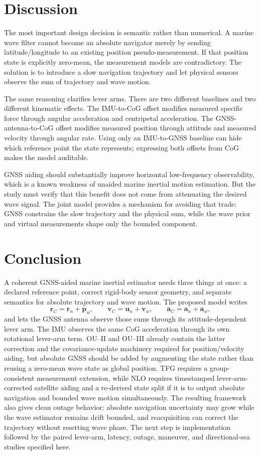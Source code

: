 \documentclass[conference]{IEEEtran}
\DeclareRobustCommand{\vct}[1]{\bm{#1}}
\begin{document}
\section{Discussion}
\label{sec:discussion}

The most important design decision is semantic rather than numerical.  A marine wave
filter cannot become an absolute navigator merely by sending latitude/longitude to an
existing position pseudo-measurement.  If that position state is explicitly
zero-mean, the measurement models are contradictory.  The solution is to introduce a
slow navigation trajectory and let physical sensors observe the sum of trajectory and
wave motion.

The same reasoning clarifies lever arms.  There are two different baselines and two
different kinematic effects.  The IMU-to-CoG offset modifies measured specific force
through angular acceleration and centripetal acceleration.  The GNSS-antenna-to-CoG
offset modifies measured position through attitude and measured velocity through
angular rate.  Using only an IMU-to-GNSS baseline can hide which reference point the
state represents; expressing both offsets from CoG makes the model auditable.

GNSS aiding should substantially improve horizontal low-frequency observability, which
is a known weakness of unaided marine inertial motion estimation.  But the study must
verify that this benefit does not come from attenuating the desired wave signal.  The
joint model provides a mechanism for avoiding that trade: GNSS constrains the slow
trajectory and the physical sum, while the wave prior and virtual measurements shape
only the bounded component.

\section{Conclusion}
\label{sec:conclusion}

A coherent GNSS-aided marine inertial estimator needs three things at once: a declared
reference point, correct rigid-body sensor geometry, and separate semantics for
absolute trajectory and wave motion.  The proposed model writes
\[
\vct r_C=\vct r_n+\vct p_w,\qquad
\vct v_C=\vct u_n+\vct v_w,\qquad
\vct a_C=\vct a_n+\vct a_w,
\]
and lets the GNSS antenna observe those sums through its attitude-dependent lever arm.
The IMU observes the same CoG acceleration through its own rotational lever-arm term.
OU--II and OU--III already contain the latter correction and the covariance-update
machinery required for position/velocity aiding, but absolute GNSS should be added by
augmenting the state rather than reusing a zero-mean wave state as global position.
TFG requires a group-consistent measurement extension, while NLO requires timestamped
lever-arm-corrected satellite aiding and a re-derived state split if it is to output
absolute navigation and bounded wave motion simultaneously.  The resulting framework
also gives clean outage behavior: absolute navigation uncertainty may grow while the
wave estimator remains drift bounded, and reacquisition can correct the trajectory
without resetting wave phase.  The next step is implementation followed by the paired
lever-arm, latency, outage, maneuver, and directional-sea studies specified here.



\end{document}
